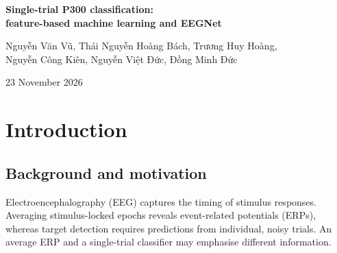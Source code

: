 \documentclass[11pt,a4paper]{article}
\begin{document}
\begin{center}
{\Large\bfseries Single-trial P300 classification:\\feature-based machine learning and EEGNet\par}
\vspace{3mm}
{Nguyễn Văn Vũ, Thái Nguyễn Hoàng Bách, Trương Huy Hoàng,\\
Nguyễn Công Kiên, Nguyễn Việt Đức, Đồng Minh Đức\par}
\vspace{2mm}
{23 November 2026}
\end{center}
\begin{abstract}
We analyse single-trial standard-versus-target classification in the Nencki--Symfonia visual oddball task using 39 task-compliant participants, 21,878 correct trials (13.49\% targets) and preprocessed 128-channel epochs at 250 Hz. The equal-participant-weight parietal target--standard effect is $5.05\pm2.28\,\mu$V in 300--500 ms. Under five-fold participant-wise evaluation, EEGNet achieves balanced accuracy $0.903\pm0.021$, ROC-AUC $0.970\pm0.013$ and average precision $0.865\pm0.045$. A matched 128-channel shrinkage-LDA control reaches ROC-AUC $0.949\pm0.022$, showing that electrode count alone does not explain the network's advantage. Five further EEGNet models discriminate correct distractors from standards, with neither class involving a button press, reaching ROC-AUC $0.926\pm0.015$. Saliency is computed only on positive test inputs in each outer fold. The pooled target profile peaks at 504 ms, places 40.7\% mass in 300--600 ms and correlates with the OOF ERP contrast at $r=0.253$. These controls establish discrimination without a motor-response contrast and explain part of the classifier's temporal and spatial sensitivity. Specific motor contributions to target decoding remain unresolved because stimulus identity and relevance also differ.


\end{abstract}
\tableofcontents

\clearpage
\section{Introduction}
\subsection{Background and motivation}
Electroencephalography (EEG) captures the timing of stimulus responses. Averaging stimulus-locked epochs reveals event-related potentials (ERPs), whereas target detection requires predictions from individual, noisy trials. An average ERP and a single-trial classifier may emphasise different information.
\end{document}
